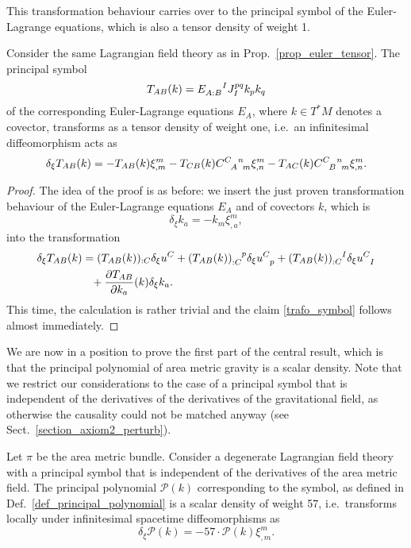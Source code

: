 This transformation behaviour carries over to the principal symbol of the Euler-Lagrange equations, which is also a tensor density of weight 1.
\begin{proposition}
  Consider the same Lagrangian field theory as in Prop.~\ref{prop_euler_tensor}. The principal symbol
  \begin{equation}\label{trafo_symbol}
    T_{AB}(k) = E_{A:B}^{\hphantom{A:B}I} J_I^{pq} k_p k_q
  \end{equation}
  of the corresponding Euler-Lagrange equations $E_A$, where $k \in T^\ast M$ denotes a covector, transforms as a tensor density of weight one, i.e.~an infinitesimal diffeomorphism acts as
  \begin{equation}
    \delta_\xi T_{AB}(k) = - T_{AB}(k) \xi^m_{,m} - T_{CB}(k) \gmc{C}{A}{n}{m} \xi^m_{,n} - T_{AC}(k) \gmc{C}{B}{n}{m} \xi^m_{,n}.
  \end{equation}
\end{proposition}
\begin{proof}
  The idea of the proof is as before: we insert the just proven transformation behaviour of the Euler-Lagrange equations $E_A$ and of covectors $k$, which is
  \begin{equation}
    \delta_\xi k_a = - k_m \xi^m_{,a},
  \end{equation}
  into the transformation
  \begin{equation}
    \begin{aligned}
      \delta_\xi T_{AB}(k) &{} = (T_{AB}(k))_{:C} \delta_\xi u^C + (T_{AB}(k))_{:C}^{\hphantom{:C}p} \delta_\xi u^C_{\hphantom Cp} + (T_{AB}(k))_{:C}^{\hphantom{:C}I} \delta_\xi u^C_{\hphantom CI} \\
                           &{} \hphantom{=} + \frac{\partial T_{AB}}{\partial k_a}(k) \delta_\xi k_a.
    \end{aligned}
  \end{equation}
  This time, the calculation is rather trivial and the claim \eqref{trafo_symbol} follows almost immediately.
\end{proof}
We are now in a position to prove the first part of the central result, which is that the principal polynomial of area metric gravity is a scalar density. Note that we restrict our considerations to the case of a principal symbol that is independent of the derivatives of the derivatives of the gravitational field, as otherwise the causality could not be matched anyway (see Sect.~\ref{section_axiom2_perturb}).
\begin{theorem}\label{thm_poly_trafo}
  Let $\pi$ be the area metric bundle. Consider a degenerate Lagrangian field theory with a principal symbol that is independent of the derivatives of the area metric field. The principal polynomial $\mathcal P(k)$ corresponding to the symbol, as defined in Def.~\ref{def_principal_polynomial} is a scalar density of weight 57, i.e.~transforms locally under infinitesimal spacetime diffeomorphisms as
  \begin{equation}
    \delta_\xi \mathcal P(k) = -57 \cdot \mathcal P(k) \xi^m_{,m}.
  \end{equation}
\end{theorem}
